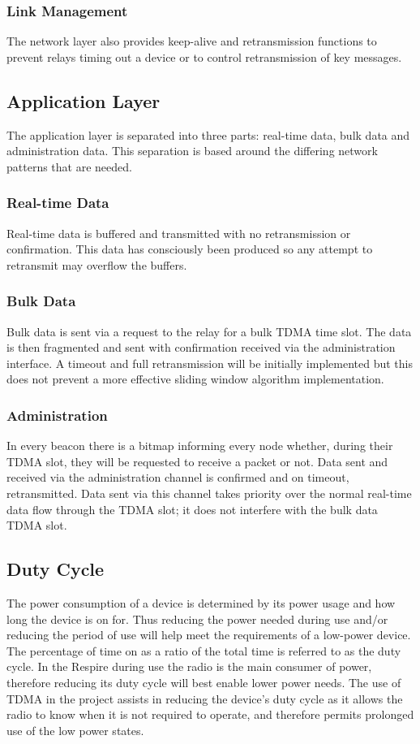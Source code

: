 \subsubsection{Link Management}
The network layer also provides keep-alive and retransmission functions to prevent relays timing out
a device or to control retransmission of key messages.


\subsection{Application Layer}
The application layer is separated into three parts: real-time data, bulk data and administration data.
This separation is based around the differing network patterns that are needed.

\subsubsection{Real-time Data}
Real-time data is buffered and transmitted with no retransmission or confirmation. This data has
consciously been produced so any attempt to retransmit may overflow the buffers.

\subsubsection{Bulk Data}
Bulk data is sent via a request to the relay for a bulk \ac{TDMA} time slot. The data is then fragmented
and sent with confirmation received via the administration interface. A timeout and full
retransmission will be initially implemented but this does not prevent a more effective sliding
window algorithm implementation.

\subsubsection{Administration}
In every beacon there is a bitmap informing every node whether, during their \ac{TDMA} slot, they will
be requested to receive a packet or not. Data sent and received via the administration channel is
confirmed and on timeout, retransmitted. Data sent via this channel takes priority over the normal
real-time data flow through the \ac{TDMA} slot; it does not interfere with the bulk data \ac{TDMA} slot.


\subsection{Duty Cycle}
The power consumption of a device is determined by its power usage and how long the device is on
for. Thus reducing the power needed during use and/or reducing the period of use will help meet
the requirements of a low-power device. The percentage of time on as a ratio of the total time is
referred to as the duty cycle. In the Respire during use the radio is the main consumer of power,
therefore reducing its duty cycle will best enable lower power needs. The use of \ac{TDMA} in the project
assists in reducing the device’s duty cycle as it allows the radio to know when it is not required to
operate, and therefore permits prolonged use of the low power states.


